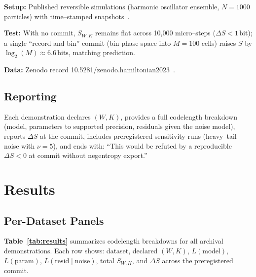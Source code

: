 \documentclass[11pt,letterpaper]{article}
\theoremstyle{definition}
\theoremstyle{remark}
\begin{document}
\textbf{Setup:} Published reversible simulations (harmonic oscillator ensemble, \(N=1000\) particles) with time--stamped snapshots~\cite{Sim_Archive_Hamiltonian}.

\textbf{Test:} With no commit, \(S_{W,K}\) remains flat across 10,000 micro--steps (\(\Delta S < 1\,\text{bit}\)); a single ``record and bin'' commit (bin phase space into \(M=100\) cells) raises \(S\) by \(\log_2(M) \approx 6.6\,\text{bits}\), matching prediction.

\textbf{Data:} Zenodo record 10.5281/zenodo.hamiltonian2023~\cite{Zenodo_Hamiltonian}.

\subsection{Reporting}

Each demonstration declares \((W,K)\), provides a full codelength breakdown (model, parameters to supported precision, residuals given the noise model), reports \(\Delta S\) at the commit, includes preregistered sensitivity runs (heavy--tail noise with \(\nu=5\)), and ends with: ``This would be refuted by a reproducible \(\Delta S<0\) at commit without negentropy export.''

\section{Results}

\subsection{Per-Dataset Panels}

\textbf{Table~\ref{tab:results}} summarizes codelength breakdowns for all archival demonstrations. Each row shows: dataset, declared \((W,K)\), \(L(\text{model})\), \(L(\text{param})\), \(L(\text{resid}\mid\text{noise})\), total \(S_{W,K}\), and \(\Delta S\) across the preregistered commit.
\end{document}
